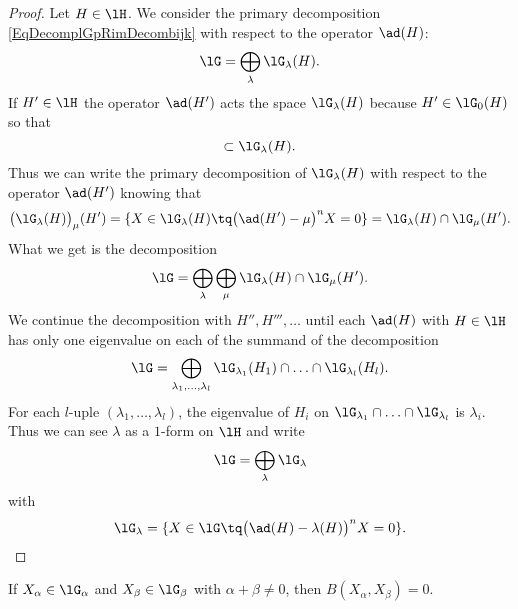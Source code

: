 \begin{proof}
    Let \( H\in\lH\). We consider the primary decomposition \eqref{EqDecomplGpRimDecombijk} with respect to the operator \( \ad(H)\):
    \begin{equation}
        \lG=\bigoplus_{\lambda}\lG_{\lambda}(H).
    \end{equation}
    If \( H'\in\lH\) the operator \( \ad(H')\) acts the space \( \lG_{\lambda}(H)\) because \( H'\in\lG_0(H)\) so that
    \begin{equation}
        [H',\lG_{\lambda}(H)]\subset\lG_{\lambda}(H).
    \end{equation}
    Thus we can write the primary decomposition of \( \lG_{\lambda}(H)\) with respect to the operator \( \ad(H')\) knowing that
    \begin{equation}
        \big( \lG_{\lambda}(H) \big)_{\mu}(H')=\{ X\in\lG_{\lambda}(H)\tq\big( \ad(H')-\mu \big)^nX=0 \}=\lG_{\lambda}(H)\cap\lG_{\mu}(H').
    \end{equation}
    What we get is the decomposition
    \begin{equation}
        \lG=\bigoplus_{\lambda}\bigoplus_{\mu}\lG_{\lambda}(H)\cap\lG_{\mu}(H').
    \end{equation}
    We continue the decomposition with \( H'',H''',\ldots\) until each \( \ad(H)\) with \( H\in\lH\) has only one eigenvalue on each of the summand of the decomposition
    \begin{equation}
        \lG=\bigoplus_{\lambda_1,\ldots,\lambda_l}\lG_{\lambda_1}(H_1)\cap\ldots\cap\lG_{\lambda_l}(H_l).
    \end{equation}
    For each \( l\)-uple \( (\lambda_1,\ldots,\lambda_l)\), the eigenvalue of \( H_i\) on \( \lG_{\lambda_1}\cap\ldots\cap\lG_{\lambda_l}\) is \( \lambda_i\). Thus we can see \( \lambda\) as a \( 1\)-form on \( \lH\) and write
    \begin{equation}        \label{EqdirectumlGRoots}
        \lG=\bigoplus_{\lambda}\lG_{\lambda}
    \end{equation}
    with
    \begin{equation}
        \lG_{\lambda}=\{ X\in\lG\tq\big( \ad(H)-\lambda(H) \big)^nX=0 \}. 
    \end{equation}
\end{proof}

\begin{corollary}\label{cor:Bxy_zero}
    If $X_{\alpha}\in\lG_{\alpha}$ and $X_{\beta}\in\lG_{\beta}$ with $\alpha+\beta\neq 0$, then $B(X_{\alpha},X_{\beta})=0$.
\end{corollary}

